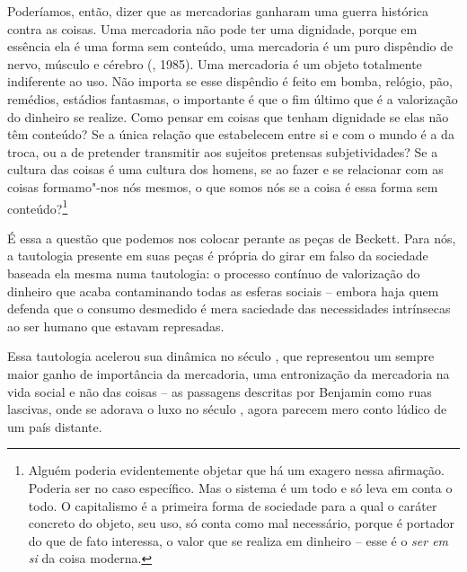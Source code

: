 Poderíamos, então, dizer que as mercadorias ganharam uma guerra
histórica contra as coisas. Uma mercadoria não pode ter uma dignidade,
porque em essência ela é uma forma sem conteúdo, uma mercadoria é um
puro dispêndio de nervo, músculo e cérebro (, 1985). Uma mercadoria
é um objeto totalmente indiferente ao uso. Não importa se esse dispêndio
é feito em bomba, relógio, pão, remédios, estádios fantasmas, o
importante é que o fim último que é a valorização do dinheiro se
realize. Como pensar em coisas que tenham dignidade se elas não têm
conteúdo? Se a única relação que estabelecem entre si e com o mundo é a
da troca, ou a de pretender transmitir aos sujeitos pretensas
subjetividades? Se a cultura das coisas é uma cultura dos homens, se ao
fazer e se relacionar com as coisas formamo"-nos nós mesmos, o que somos
nós se a coisa é essa forma sem conteúdo?\footnote{Alguém poderia
  evidentemente objetar que há um exagero nessa afirmação. Poderia ser
  no caso específico. Mas o sistema é um todo e só leva em conta o todo.
  O capitalismo é a primeira forma de sociedade para a qual o caráter
  concreto do objeto, seu uso, só conta como mal necessário, porque é
  portador do que de fato interessa, o valor que se realiza em dinheiro
  -- esse é o \emph{ser em si} da coisa moderna.}

É essa a questão que podemos nos colocar perante as peças de Beckett.
Para nós, a tautologia presente em suas peças é própria do girar em
falso da sociedade baseada ela mesma numa tautologia: o processo
contínuo de valorização do dinheiro que acaba contaminando todas as
esferas sociais -- embora haja quem defenda que o consumo desmedido é
mera saciedade das necessidades intrínsecas ao ser humano que estavam
represadas.

Essa tautologia acelerou sua dinâmica no século , que representou um
sempre maior ganho de importância da mercadoria, uma entronização da
mercadoria na vida social e não das coisas -- as passagens descritas por
Benjamin como ruas lascivas, onde se adorava o luxo no século , agora
parecem mero conto lúdico de um país distante.


